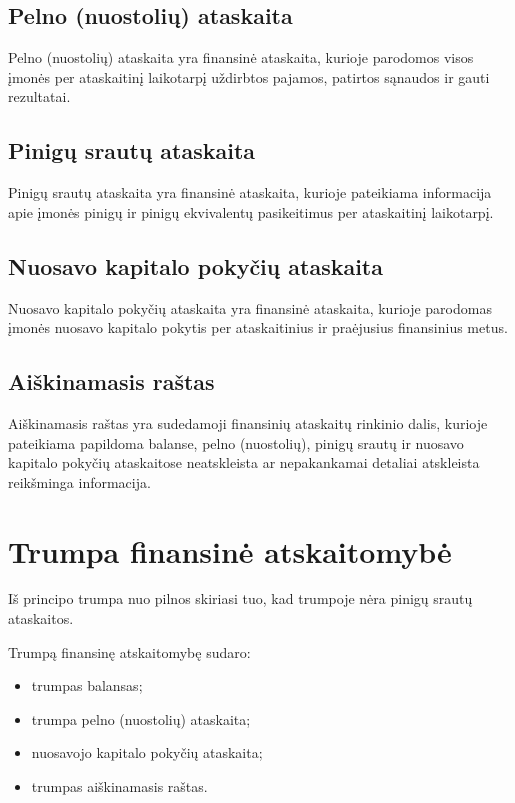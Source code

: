 \subsection{Pelno (nuostolių) ataskaita}


Pelno (nuostolių) ataskaita yra finansinė ataskaita, kurioje parodomos
visos įmonės per ataskaitinį laikotarpį uždirbtos pajamos, patirtos
sąnaudos ir gauti rezultatai.

\subsection{Pinigų srautų ataskaita}


Pinigų srautų ataskaita yra finansinė ataskaita, kurioje pateikiama
informacija apie įmonės pinigų ir pinigų ekvivalentų pasikeitimus
per ataskaitinį laikotarpį.

\subsection{Nuosavo kapitalo pokyčių ataskaita}


Nuosavo kapitalo pokyčių ataskaita yra finansinė ataskaita, kurioje
parodomas įmonės nuosavo kapitalo pokytis per ataskaitinius ir
praėjusius finansinius metus.

\subsection{Aiškinamasis raštas}


Aiškinamasis raštas yra sudedamoji finansinių ataskaitų rinkinio dalis,
kurioje pateikiama papildoma balanse, pelno (nuostolių), pinigų srautų
ir nuosavo kapitalo pokyčių ataskaitose neatskleista ar nepakankamai
detaliai atskleista reikšminga informacija.

\section{Trumpa finansinė atskaitomybė}


Iš principo trumpa nuo pilnos skiriasi tuo, kad trumpoje nėra pinigų
srautų ataskaitos.

Trumpą finansinę atskaitomybę sudaro:
\begin{itemize}
  \item trumpas balansas;
  \item trumpa pelno (nuostolių) ataskaita;
  \item nuosavojo kapitalo pokyčių ataskaita;
  \item trumpas aiškinamasis raštas.
\end{itemize}

